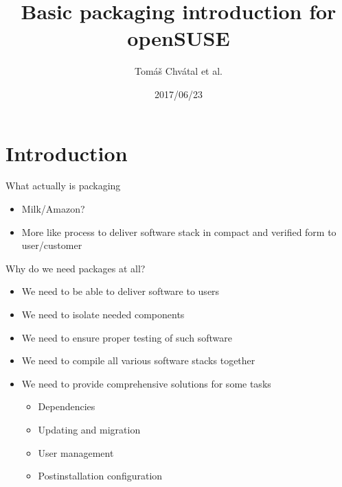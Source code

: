 \documentclass{beamer}
\author{Tom\'{a}\v{s} Chv\'{a}tal et al.\newline {\small tchvatal@suse.com}\newline {\small Packaging/L3 - Packaging}}
\title{Basic packaging introduction for openSUSE}
\date{2017/06/23}
\begin{document}
\begin{frame}[t,plain]
\titlepage
\end{frame}

\section{Introduction}

\begin{frame}[t]{What actually is packaging}
	\begin{itemize}
	\item Milk/Amazon?
	\item More like process to deliver software stack in compact and verified form to user/customer
	\end{itemize}
\end{frame}


\begin{frame}[t]{Why do we need packages at all?}
	\begin{itemize}
	\item We need to be able to deliver software to users
  \item We need to isolate needed components
	\item We need to ensure proper testing of such software
	\item We need to compile all various software stacks together
	\item We need to provide comprehensive solutions for some tasks
    \begin{itemize}
      \item Dependencies
      \item Updating and migration
      \item User management
      \item Postinstallation configuration
    \end{itemize}
	\end{itemize}
\end{frame}
\end{document}
